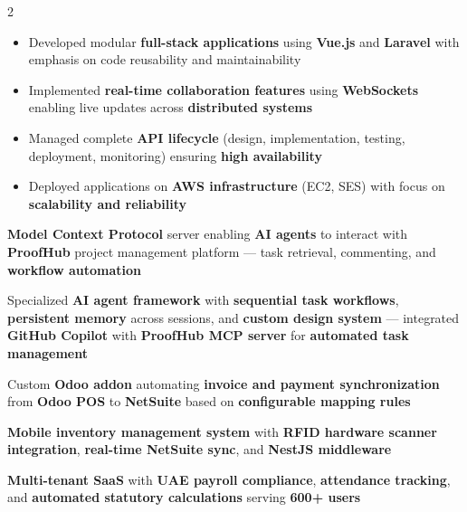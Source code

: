 \documentclass[10pt,a4paper,ragged2e,withhyper]{altacv}
\begin{document}
\begin{paracol}{2}
\begin{itemize}
\item Developed modular \textbf{full-stack applications} using \textbf{Vue.js} and \textbf{Laravel} with emphasis on code reusability and maintainability
\item Implemented \textbf{real-time collaboration features} using \textbf{WebSockets} enabling live updates across \textbf{distributed systems}
\item Managed complete \textbf{API lifecycle} (design, implementation, testing, deployment, monitoring) ensuring \textbf{high availability}
\item Deployed applications on \textbf{AWS infrastructure} (EC2, SES) with focus on \textbf{scalability and reliability}
\end{itemize}

\medskip


\textbf{Model Context Protocol} server enabling \textbf{AI agents} to interact with \textbf{ProofHub} project management platform — task retrieval, commenting, and \textbf{workflow automation}

\divider

Specialized \textbf{AI agent framework} with \textbf{sequential task workflows}, \textbf{persistent memory} across sessions, and \textbf{custom design system} — integrated \textbf{GitHub Copilot} with \textbf{ProofHub MCP server} for \textbf{automated task management}

\divider

Custom \textbf{Odoo addon} automating \textbf{invoice and payment synchronization} from \textbf{Odoo POS} to \textbf{NetSuite} based on \textbf{configurable mapping rules}

\divider

\textbf{Mobile inventory management system} with \textbf{RFID hardware scanner integration}, \textbf{real-time NetSuite sync}, and \textbf{NestJS middleware}

\divider

\textbf{Multi-tenant SaaS} with \textbf{UAE payroll compliance}, \textbf{attendance tracking}, and \textbf{automated statutory calculations} serving \textbf{600+ users}


\end{paracol}
\end{document}

